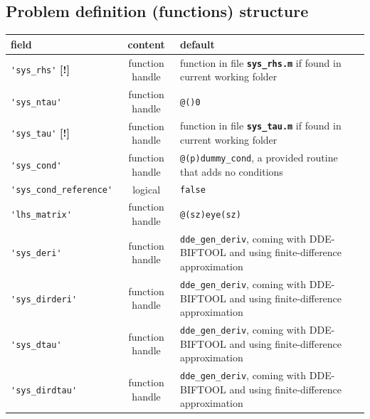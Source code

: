 \documentclass[10pt]{scrartcl}
\newcommand{\DDEBIFCODE}{\textsc{DDE-BIFTOOL}}
\newcommand{\file}[1]{\textbf{\texttt{#1}}}
\newcommand{\blist}[1]{\mbox{\lstinline!#1!}}
\begin{document}
\subsection{Problem definition (functions) structure}
\label{sec:funcs:struct}
\begin{table}[htbp]
  \centering
  \begin{tabular}[t]{l@{\hspace*{1ex}}c@{\hspace*{3ex}}p{}}
      \hline\noalign{\smallskip}
      field     & content &  default   \\\hline\noalign{\smallskip}
      \blist{'sys_rhs'} \textbf{\textsf{[!]}} & function handle &  function in file \file{sys\_rhs.m} if found in 
      current working folder \\[1ex]
      \blist{'sys_ntau'} & function handle &  \blist{@()0} \\[1ex]
      \blist{'sys_tau'} \textbf{\textsf{[!]}} & function handle &  function in file 
      \file{sys\_tau.m} if found in current working folder\\[1ex]
      \blist{'sys_cond'} & function handle & \blist{@(p)dummy_cond}, a provided routine that adds no conditions\\[1ex]
      \blist{'sys_cond_reference'} & logical & \blist{false}\\[1ex]
      \blist{'lhs_matrix'} & function handle & \blist{@(sz)eye(sz)}\\[1ex]
      \blist{'sys_deri'} & function handle & \blist{dde_gen_deriv}, coming with 
      \DDEBIFCODE{} and using finite-difference approximation\\[1ex]
      \blist{'sys_dirderi'} & function handle & \blist{dde_gen_deriv}, coming with 
      \DDEBIFCODE{} and using finite-difference approximation\\[1ex]
      \blist{'sys_dtau'} & function handle &  \blist{dde_gen_deriv}, coming with 
      \DDEBIFCODE{} and using finite-difference approximation\\[1ex]
      \blist{'sys_dirdtau'} & function handle &  \blist{dde_gen_deriv}, coming with 
      \DDEBIFCODE{} and using finite-difference approximation\\[1ex]

\end{tabular}
\end{table}
\end{document}
